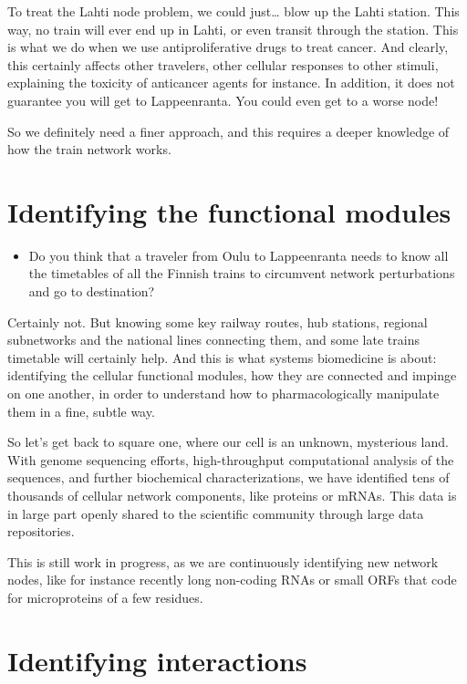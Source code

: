 \documentclass[
]{book}
\providecommand{\tightlist}{%
  \setlength{\itemsep}{0pt}\setlength{\parskip}{0pt}}
\begin{document}
To treat the Lahti node problem, we could just\ldots{} blow up the Lahti station. This way, no train will ever end up in Lahti, or even transit through the station. This is what we do when we use antiproliferative drugs to treat cancer. And clearly, this certainly affects other travelers, other cellular responses to other stimuli, explaining the toxicity of anticancer agents for instance. In addition, it does not guarantee you will get to Lappeenranta. You could even get to a worse node!

So we definitely need a finer approach, and this requires a deeper knowledge of how the train network works.

\hypertarget{identifying-the-functional-modules}{%
\section{Identifying the functional modules}\label{identifying-the-functional-modules}}

\begin{itemize}
\tightlist
\item
  Do you think that a traveler from Oulu to Lappeenranta needs to know all the timetables of all the Finnish trains to circumvent network perturbations and go to destination?
\end{itemize}

Certainly not. But knowing some key railway routes, hub stations, regional subnetworks and the national lines connecting them, and some late trains timetable will certainly help. And this is what systems biomedicine is about: identifying the cellular functional modules, how they are connected and impinge on one another, in order to understand how to pharmacologically manipulate them in a fine, subtle way.

So let's get back to square one, where our cell is an unknown, mysterious land. With genome sequencing efforts, high-throughput computational analysis of the sequences, and further biochemical characterizations, we have identified tens of thousands of cellular network components, like proteins or mRNAs. This data is in large part openly shared to the scientific community through large data repositories.

This is still work in progress, as we are continuously identifying new network nodes, like for instance recently long non-coding RNAs or small ORFs that code for microproteins of a few residues.

\hypertarget{identifying-interactions}{%
\section{Identifying interactions}\label{identifying-interactions}}
\end{document}
